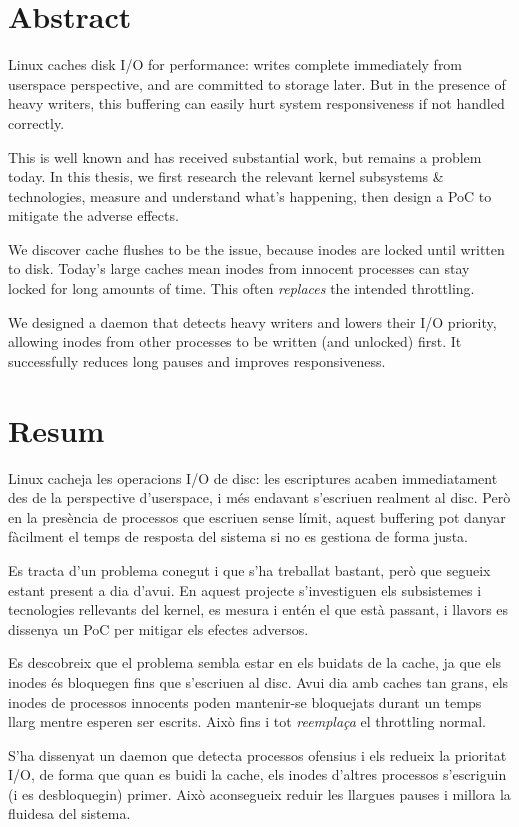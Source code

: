 \documentclass[a4paper,12pt]{article}
\begin{document}
\clearpage
{}
{}
\section*{Abstract}

Linux caches disk I/O for performance: writes complete immediately from userspace perspective, and are committed to storage later.
But in the presence of heavy writers, this buffering can easily hurt system responsiveness if not handled correctly.

This is well known and has received substantial work, but remains a problem today. In this thesis, we first research the relevant kernel subsystems \& technologies, measure and understand what's happening, then design a PoC to mitigate the adverse effects.

We discover cache flushes to be the issue, because inodes are locked until written to disk. Today's large caches mean inodes from innocent processes can stay locked for long amounts of time. This often \emph{replaces} the intended throttling.

We designed a daemon that detects heavy writers and lowers their I/O priority, allowing inodes from other processes to be written (and unlocked) first. It successfully reduces long pauses and improves responsiveness.

\clearpage
{}
{}
\section*{Resum}

\begin{otherlanguage}{catalan}
Linux cacheja les operacions I/O de disc: les escriptures acaben immediatament des de la perspective d'userspace, i més endavant s'escriuen realment al disc. Però en la presència de processos que escriuen sense límit, aquest buffering pot danyar fàcilment el temps de resposta del sistema si no es gestiona de forma justa.

Es tracta d'un problema conegut i que s'ha treballat bastant, però que segueix estant present a dia d'avui. En aquest projecte s'investiguen els subsistemes i tecnologies rellevants del kernel, es mesura i entén el que està passant, i llavors es dissenya un PoC per mitigar els efectes adversos.

Es descobreix que el problema sembla estar en els buidats de la cache, ja que els inodes és bloquegen fins que s'escriuen al disc. Avui dia amb caches tan grans, els inodes de processos innocents poden mantenir-se bloquejats durant un temps llarg mentre esperen ser escrits. Això fins i tot \emph{reemplaça} el throttling normal.

S'ha dissenyat un daemon que detecta processos ofensius i els redueix la prioritat I/O, de forma que quan es buidi la cache, els inodes d'altres processos s'escriguin (i es desbloquegin) primer. Això aconsegueix reduir les llargues pauses i millora la fluidesa del sistema.
\end{otherlanguage}
\end{document}
